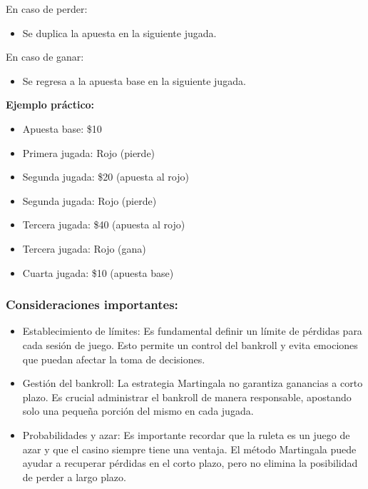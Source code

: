 \documentclass{article}
\begin{document}
En caso de perder:

\begin{itemize}
    \item Se duplica la apuesta en la siguiente jugada.
\end{itemize}

En caso de ganar:

\begin{itemize}
    \item Se regresa a la apuesta base en la siguiente jugada.
\end{itemize}

\textbf{Ejemplo práctico:}

\begin{itemize}
    \item Apuesta base: \$10
    \item Primera jugada: Rojo (pierde)
    \item Segunda jugada: \$20 (apuesta al rojo)
    \item Segunda jugada: Rojo (pierde)
    \item Tercera jugada: \$40 (apuesta al rojo)
    \item Tercera jugada: Rojo (gana)
    \item Cuarta jugada: \$10 (apuesta base)
\end{itemize}

\subsubsection{Consideraciones importantes:}

\begin{itemize}
    \item Establecimiento de límites: Es fundamental definir un límite de pérdidas para cada sesión de juego. Esto permite un control del bankroll y evita emociones que puedan afectar la toma de decisiones.
    \item Gestión del bankroll: La estrategia Martingala no garantiza ganancias a corto plazo. Es crucial administrar el bankroll de manera responsable, apostando solo una pequeña porción del mismo en cada jugada.
    \item Probabilidades y azar: Es importante recordar que la ruleta es un juego de azar y que el casino siempre tiene una ventaja. El método Martingala puede ayudar a recuperar pérdidas en el corto plazo, pero no elimina la posibilidad de perder a largo plazo.
\end{itemize}
\end{document}
